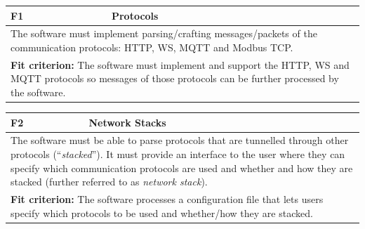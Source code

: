\begin{center}

    \begin{tabular}{|p{1cm}|p{12cm}|}
        \hline
        \textbf{F1} & \textbf{Protocols}                                                                                                                                                                                    \\ \hline
        \multicolumn{2}{|p{12cm}|}{The software must implement parsing/crafting messages/packets of the communication protocols: \ac{HTTP}\footnotemark, \ac{WS}, \ac{MQTT} and Modbus \ac{TCP}.}                           \\ \hline
        \multicolumn{2}{|p{12cm}|}{\textbf{Fit criterion:} The software must implement and support the \ac{HTTP}, \ac{WS} and \ac{MQTT} protocols so messages of those protocols can be further processed by the software.} \\ \hline
    \end{tabular}
\end{center}
\begin{center}

    \begin{tabular}{|p{1cm}|p{12cm}|}
        \hline
        \textbf{F2} & \textbf{Network Stacks}                                                                                                                                                                                                                                                                                                      \\ \hline
        \multicolumn{2}{|p{12cm}|}{The software must be able to parse protocols that are tunnelled through other protocols (\enquote{\emph{stacked}}). It must provide an interface to the user where they can specify which communication protocols are used and whether and how they are stacked (further referred to as \emph{network stack}).} \\ \hline
        \multicolumn{2}{|p{12cm}|}{\textbf{Fit criterion:} The software processes a configuration file that lets users specify which protocols to be used and whether/how they are stacked.}                                                                                                                                                       \\ \hline
    \end{tabular}
\end{center}
